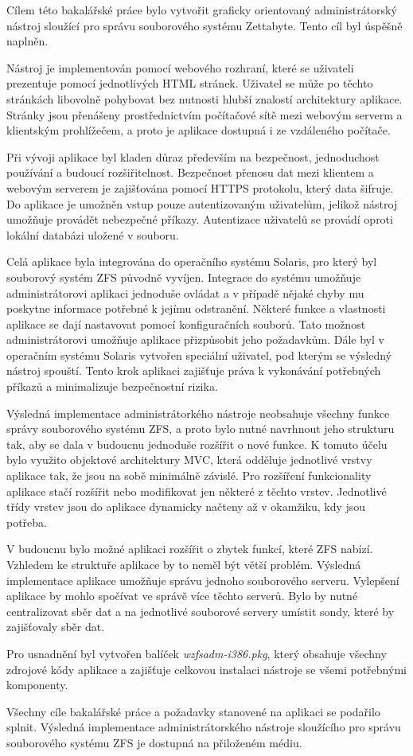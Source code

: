 Cílem této bakalářské práce bylo vytvořit graficky orientovaný administrátorský nástroj sloužící pro správu souborového systému Zettabyte. Tento cíl byl úspěšně naplněn.

Nástroj je implementován pomocí webového rozhraní, které se uživateli prezentuje pomocí jednotlivých HTML stránek. Uživatel se může po těchto stránkách libovolně pohybovat bez nutnosti hlubší znalostí architektury aplikace. Stránky jsou přenášeny prostřednictvím počítačové sítě mezi webovým serverm a klientským prohlížečem, a proto je aplikace dostupná i ze vzdáleného počítače.

Při vývoji aplikace byl kladen důraz především na bezpečnost, jednoduchost používání a budoucí rozšiřitelnost. Bezpečnost přenosu dat mezi klientem a webovým serverem je zajišťována pomocí HTTPS protokolu, který data šifruje. Do aplikace je umožněn vstup pouze autentizovaným uživatelům, jelikož nástroj umožňuje provádět nebezpečné příkazy. Autentizace uživatelů se provádí oproti lokální databázi uložené v souboru.

Celá aplikace byla integrována do operačního systému Solaris, pro který byl souborový systém ZFS původně vyvíjen. Integrace do systému umožňuje administrátorovi aplikaci jednoduše ovládat a v případě nějaké chyby mu poskytne informace potřebné k jejímu odstranění. Některé funkce a vlastnosti aplikace se dají nastavovat pomocí konfiguračních souborů. Tato možnost administrátorovi umožňuje aplikace přizpůsobit jeho požadavkům. Dále byl v operačním systému Solaris vytvořen speciální uživatel, pod kterým se výsledný nástroj spouští. Tento krok aplikaci zajišťuje práva k vykonávání potřebných příkazů a minimalizuje bezpečnostní rizika.

Výsledná implementace administrátorkého nástroje neobsahuje všechny funkce správy souborového systému ZFS, a proto bylo nutné navrhnout jeho strukturu tak, aby se dala v budoucnu jednoduše rozšířit o nové funkce. K tomuto účelu bylo využito objektové architektury MVC, která odděluje jednotlivé vrstvy aplikace tak, že jsou na sobě minimálně závislé. Pro rozšíření funkcionality aplikace stačí rozšířit nebo modifikovat jen některé z těchto vrstev. Jednotlivé třídy vrstev jsou do aplikace dynamicky načteny až v okamžiku, kdy jsou potřeba.

V budoucnu bylo možné aplikaci rozšířit o zbytek funkcí, které ZFS nabízí. Vzhledem ke struktuře aplikace by to neměl být větší problém. Výsledná implementace aplikace umožňuje správu jednoho souborového serveru. Vylepšení aplikace by mohlo spočívat ve správě více těchto serverů. Bylo by nutné centralizovat sběr dat a na jednotlivé souborové servery umístit sondy, které by zajišťovaly sběr dat.

Pro usnadnění byl vytvořen balíček \emph{wzfsadm-i386.pkg}, který obsahuje všechny zdrojové kódy aplikace a zajišťuje celkovou instalaci nástroje se všemi potřebnými komponenty.

Všechny cíle bakalářské práce a požadavky stanovené na aplikaci se podařilo splnit. Výsledná implementace administrátorského nástroje sloužícího pro správu souborového systému ZFS je dostupná na přiloženém médiu.




